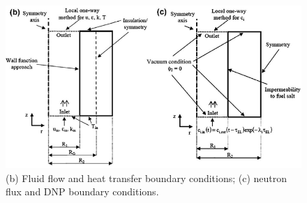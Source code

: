 \documentclass{article}
\begin{document}
\begin{figure}[htpb]
  \centering
  \includegraphics[max height=.5\textheight,max width=\textwidth,keepaspectratio]{Cammi_simplification_2.png}
  \caption{(b) Fluid flow and heat transfer boundary conditions; (c) neutron flux and DNP boundary conditions. \cite{cammi_multi-physics_2011}}
  \label{fig:simlification-2}
\end{figure}

\FloatBarrier



\end{document}
